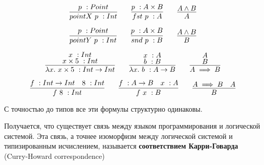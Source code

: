 \documentclass[a4paper,14pt]{extreport} %
\begin{document}
\begin{equation*}
\infer{pointX \ p \ :Int}{%
    p \ :Point
}
\qquad
\infer{fst \ p \ :A}{%
    p \ :A \times B
}
\qquad
\infer{A}{%
    A \land B
}
\end{equation*}

\begin{equation*}
\infer{pointY \ p \ :Int}{%
    p \ :Point
}
\qquad
\infer{snd \ p \ :B}{%
    p \ :A \times B
}
\qquad
\infer{B}{%
    A \land B
}
\end{equation*}

\begin{equation*}
\infer{\lambda x . \ x \times 5 \ :Int \rightarrow Int}{%
    \deduce{x \times 5 \ :Int}{x \ :Int}
}
\qquad
\infer{\lambda x . \ b \ :A \rightarrow B}{%
    \deduce{b \ :B}{x \ :A}
}
\qquad
\infer{A \implies B}{%
    \deduce{B}{A}
}
\end{equation*}

\begin{equation*}
\infer{f \ 8 \ :Int}{%
    f \ :Int \rightarrow Int & 8 \ :Int
}
\qquad
\infer{f \ x \ :B}{%
    f \ :A \rightarrow B & x \ :A
}
\qquad
\infer{B}{%
    A \implies B & A
}
\end{equation*}

С точностью до типов все эти формулы структурно одинаковы.

Получается, что существует связь между языком программирования и логической системой. Эта связь, а точнее изоморфизм между логической системой и типизированным исчислением, называется \textbf{соответствием Карри-Говарда} (Curry-Howard correspondence)
\end{document}
